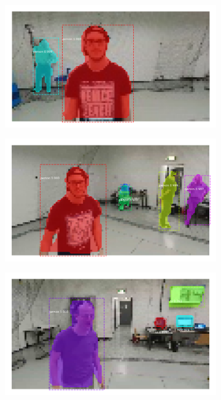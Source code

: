 \begin{figure}[!h]
	\begin{center}
		\begin{subfigure}[h]{0.32\textwidth}
			\centering
			\includegraphics[width=1\textwidth]{"contents/images/04-maskrcnn-train-1"}
		\end{subfigure}
		\begin{subfigure}[h]{0.32\textwidth}
			\centering
			\includegraphics[width=1\textwidth]{"contents/images/04-maskrcnn-train-2"}
		\end{subfigure}
		\begin{subfigure}[h]{0.32\textwidth}
			\centering
			\includegraphics[width=1\textwidth]{"contents/images/04-maskrcnn-train-3"}

\end{subfigure}
\end{center}
\end{figure}
